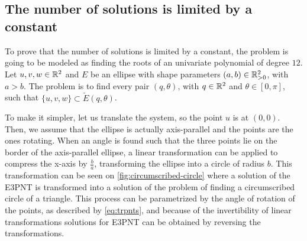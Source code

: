 \subsection{The number of solutions is limited by a constant}

To prove that the number of solutions is limited by a constant, the problem is going to be modeled as finding the roots of an univariate polynomial of degree $12$. Let $u, v, w \in \mathbb{R}^2$ and $E$ be an ellipse with shape parameters $(a, b) \in \mathbb{R}^2_{>0}$, with $a > b$. The problem is to find every pair $(q, \theta)$, with $q \in \mathbb{R}^2$ and $\theta \in [0, \pi]$, such that $\{u, v, w\} \subset \tilde{E}(q, \theta)$.

To make it simpler, let us translate the system, so the point $u$ is at $(0,0)$. Then, we assume that the ellipse is actually axis-parallel and the points are the ones rotating. When an angle is found such that the three points lie on the border of the axis-parallel ellipse, a linear transformation can be applied to compress the x-axis by $\frac{b}{a}$, transforming the ellipse into a circle of radius $b$. This transformation can be seen on \autoref{fig:circumscribed-circle} where a solution of the E3PNT is transformed into a solution of the problem of finding a circumscribed circle of a triangle. 
This process can be parametrized by the angle of rotation of the points, as described by \autoref{eq:trpnts}, and because of the invertibility of linear transformations solutions for E3PNT can be obtained by reversing the transformations.

